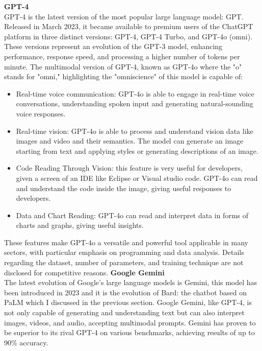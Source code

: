 \textbf{GPT-4}\\
GPT-4 is the latest version of the most popular large language model: GPT. Released in March 2023, it became available to premium users of the ChatGPT platform in three distinct versions: GPT-4, GPT-4 Turbo, and GPT-4o (omni). These versions represent an evolution of the GPT-3 model, enhancing performance, response speed, and processing a higher number of tokens per minute.\cite{insights_gpt4} The multimodal version of GPT-4, known as GPT-4o where the "o" stands for "omni," highlighting the "omniscience" of this model is capable of:
\begin{itemize}
    \item Real-time voice communication: GPT-4o is able to engage in real-time voice conversations, understanding spoken input and generating natural-sounding voice responses.

    \item Real-time vision: GPT-4o is able to process and understand vision data like images and video and their semantics. The model can generate an image starting from text and applying styles or generating descriptions of an image.

    \item Code Reading Through Vision: this feature is very useful for developers, given a screen of an IDE like Eclipse or Visual studio code. GPT-4o can read and understand the code inside the image, giving useful responses to developers.

    \item Data and Chart Reading: GPT-4o can read and interpret data in forms of charts and graphs, giving useful insights.
\end{itemize}
These features make GPT-4o a versatile and powerful tool applicable in many sectors, with particular emphasis on programming and data analysis. Details regarding the dataset, number of parameters, and training technique are not disclosed for competitive reasons.
\textbf{Google Gemini}\\
The latest evolution of Google's large language models is Gemini, this model has been introduced in 2023 and it is the evolution of Bard: the chatbot based on PaLM which I discussed in the previous section. Google Gemini, like GPT-4, is not only capable of generating and understanding text but can also interpret images, videos, and audio, accepting multimodal prompts.\cite{gemini_introduction}
Gemini has proven to be superior to its rival GPT-4 on various benchmarks, achieving results of up to 90\% accuracy.\\ %

